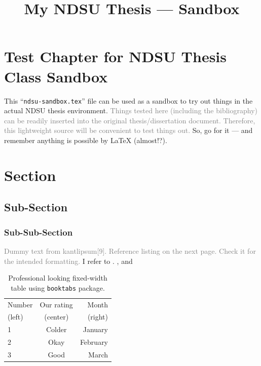 \documentclass{article}
\title{My NDSU Thesis --- Sandbox}
\begin{document}
\maketitle

\section{Test Chapter for NDSU Thesis Class Sandbox}

This ``\texttt{ndsu-sandbox.tex}'' file can be used as a sandbox to try out things in the actual NDSU thesis environment. \textcolor{gray}{Things tested here (including the bibliography) can be readily inserted into the original thesis/dissertation document. Therefore, this lightweight source will be convenient to test things out.} So, go for it --- and remember anything is possible by \LaTeX{} (almost!?).

\section{Section}
\subsection{Sub-Section}
\subsubsection{Sub-Sub-Section}

\textcolor{gray}{Dummy text from kantlipsum[9]. Reference listing on the next page. Check it for the intended formatting.} I refer to \cite{lamport94,kopka2004guide,baczkowski1990ndsu}. \kant[9] 
\cite{kopka2004guide}, \cite{baczkowski1990ndsu} and \cite{lamport94,kopka2004guide}


\begin{table}[ht]
\centering
\caption{Professional looking fixed-width table using 
\texttt{booktabs} package.}
\begin{tabular}{ l c r }
\toprule
Number & Our rating & Month \\
(left) & (center)   & (right)\\
\midrule
1 & Colder & January \\
2 & Okay   & February \\
3 & Good   & March\\
\bottomrule
\end{tabular}
\label{tab22}
\end{table}
\end{document}
